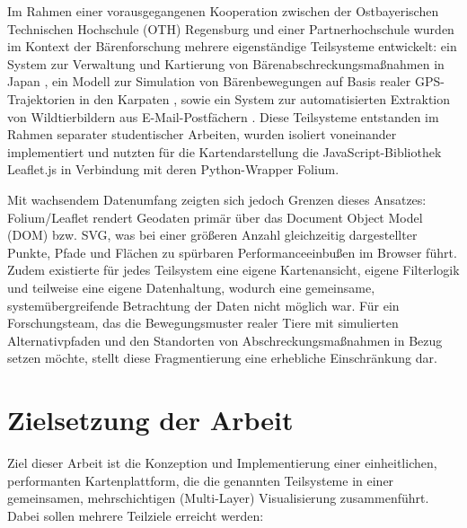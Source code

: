 \documentclass[12pt,a4paper]{report}
\begin{document}
Im Rahmen einer vorausgegangenen Kooperation zwischen der Ostbayerischen Technischen Hochschule (OTH) Regensburg und einer Partnerhochschule wurden im Kontext der Bärenforschung mehrere eigenständige Teilsysteme entwickelt: ein System zur Verwaltung und Kartierung von Bärenabschreckungsmaßnahmen in Japan \cite{TODO:LorenzBA}, ein Modell zur Simulation von Bärenbewegungen auf Basis realer GPS-Trajektorien in den Karpaten \cite{TODO:BreuBA}, sowie ein System zur automatisierten Extraktion von Wildtierbildern aus E-Mail-Postfächern \cite{TODO:LelchatBA}. Diese Teilsysteme entstanden im Rahmen separater studentischer Arbeiten, wurden isoliert voneinander implementiert und nutzten für die Kartendarstellung die JavaScript-Bibliothek Leaflet.js in Verbindung mit deren Python-Wrapper Folium.

Mit wachsendem Datenumfang zeigten sich jedoch Grenzen dieses Ansatzes: Folium/Leaflet rendert Geodaten primär über das Document Object Model (DOM) bzw. SVG, was bei einer größeren Anzahl gleichzeitig dargestellter Punkte, Pfade und Flächen zu spürbaren Performanceeinbußen im Browser führt. Zudem existierte für jedes Teilsystem eine eigene Kartenansicht, eigene Filterlogik und teilweise eine eigene Datenhaltung, wodurch eine gemeinsame, systemübergreifende Betrachtung der Daten nicht möglich war. Für ein Forschungsteam, das die Bewegungsmuster realer Tiere mit simulierten Alternativpfaden und den Standorten von Abschreckungsmaßnahmen in Bezug setzen möchte, stellt diese Fragmentierung eine erhebliche Einschränkung dar.

\section{Zielsetzung der Arbeit}

Ziel dieser Arbeit ist die Konzeption und Implementierung einer einheitlichen, performanten Kartenplattform, die die genannten Teilsysteme in einer gemeinsamen, mehrschichtigen (Multi-Layer) Visualisierung zusammenführt. Dabei sollen mehrere Teilziele erreicht werden:
\end{document}
